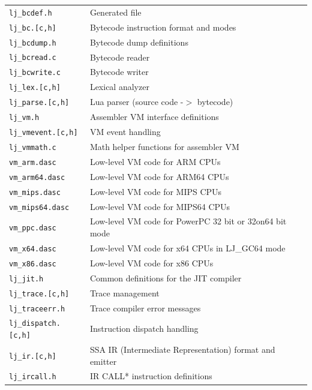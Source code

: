 \begin{center}
\begin{longtable}{|p{4cm}|p{9cm}|}
\hline

\texttt{lj\_bcdef.h} & Generated file\\
\texttt{lj\_bc.[c,h]} & Bytecode instruction format and modes\\
\texttt{lj\_bcdump.h} & Bytecode dump definitions\\
\texttt{lj\_bcread.c} & Bytecode reader\\
\texttt{lj\_bcwrite.c} & Bytecode writer\\

\hline

\texttt{lj\_lex.[c,h]} & Lexical analyzer\\
\texttt{lj\_parse.[c,h]} & Lua parser (source code -$>$ bytecode)\\

\hline

\texttt{lj\_vm.h} & Assembler VM interface definitions\\
\texttt{lj\_vmevent.[c,h]} & VM event handling\\
\texttt{lj\_vmmath.c} & Math helper functions for assembler VM\\
\texttt{vm\_arm.dasc} & Low-level VM code for ARM CPUs\\
\texttt{vm\_arm64.dasc} & Low-level VM code for ARM64 CPUs\\
\texttt{vm\_mips.dasc} & Low-level VM code for MIPS CPUs\\
\texttt{vm\_mips64.dasc} & Low-level VM code for MIPS64 CPUs\\
\texttt{vm\_ppc.dasc} & Low-level VM code for PowerPC 32 bit or 32on64 bit mode\\
\texttt{vm\_x64.dasc} & Low-level VM code for x64 CPUs in LJ\_GC64 mode\\
\texttt{vm\_x86.dasc} & Low-level VM code for x86 CPUs\\

\hline

\texttt{lj\_jit.h} & Common definitions for the JIT compiler\\
\texttt{lj\_trace.[c,h]} & Trace management\\
\texttt{lj\_traceerr.h} & Trace compiler error messages\\
\texttt{lj\_dispatch.[c,h]} & Instruction dispatch handling\\

\hline

\texttt{lj\_ir.[c,h]} & SSA IR (Intermediate Representation) format and emitter\\
\texttt{lj\_ircall.h} & IR CALL* instruction definitions\\


\end{longtable}
\end{center}
